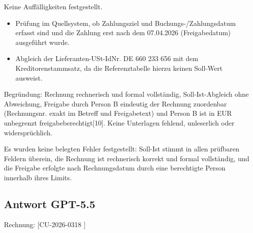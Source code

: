 Keine Auffälligkeiten festgestellt.

\begin{itemize}
    \item Prüfung im Quellsystem, ob Zahlungsziel und Buchungs-/Zahlungsdatum erfasst sind und die Zahlung erst nach dem 07.04.2026 (Freigabedatum) ausgeführt wurde.
    \item Abgleich der Lieferanten-USt-IdNr. DE 660 233 656 mit dem Kreditorenstammsatz, da die Referenztabelle hierzu keinen Soll-Wert ausweist.
\end{itemize}

Begründung: Rechnung rechnerisch und formal vollständig, Soll-Ist-Abgleich ohne Abweichung, Freigabe durch Person B eindeutig der Rechnung zuordenbar (Rechnungsnr. exakt im Betreff und Freigabetext) und Person B ist in EUR unbegrenzt freigabeberechtigt[10]. Keine Unterlagen fehlend, unleserlich oder widersprüchlich.

Es wurden keine belegten Fehler festgestellt: Soll-Ist stimmt in allen prüfbaren Feldern überein, die Rechnung ist rechnerisch korrekt und formal vollständig, und die Freigabe erfolgte nach Rechnungsdatum durch eine berechtigte Person innerhalb ihres Limits.


\clearpage
\subsection*{Antwort GPT-5.5}

{\RechnungKopfStil Rechnung: [CU-2026-0318 \textbar{} ]}\par


